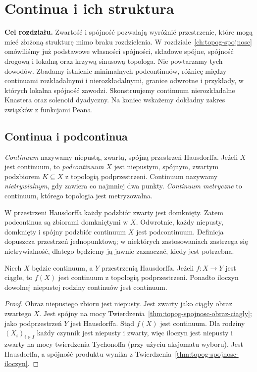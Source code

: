 \chapter{Continua i ich struktura}
\label{ch:topog25-continua}

\noindent\textbf{Cel rozdziału.}
Zwartość i spójność pozwalają wyróżnić przestrzenie, które
mogą mieć złożoną strukturę mimo braku rozdzielenia.
W rozdziale~\ref{ch:topog-spojnosc} omówiliśmy już
podstawowe własności spójności, składowe spójne,
spójność drogową i lokalną oraz krzywą sinusową topologa.
Nie powtarzamy tych dowodów.
Zbadamy istnienie minimalnych podcontinuów,
różnicę między continuami rozkładalnymi i nierozkładalnymi,
granice odwrotne i przykłady, w których lokalna spójność
zawodzi.
Skonstruujemy continuum nierozkładalne Knastera
oraz solenoid dyadyczny.
Na koniec wskażemy dokładny zakres związków
z funkcjami Peana.

\section{Continua i podcontinua}
\label{sec:topog25-basic}

\begin{definicja}
\label{def:topog25-continuum}
\emph{Continuum} nazywamy niepustą, zwartą,
spójną przestrzeń Hausdorffa.
Jeżeli \(X\) jest continuum,
to \emph{podcontinuum} \(X\)
jest niepustym, spójnym, zwartym podzbiorem \(K\subseteq X\)
z topologią podprzestrzeni.
Continuum nazywamy \emph{nietrywialnym},
gdy zawiera co najmniej dwa punkty.
\emph{Continuum metryczne} to continuum,
którego topologia jest metryzowalna.
\end{definicja}

\begin{uwaga}
\label{rem:topog25-closed}
W przestrzeni Hausdorffa każdy podzbiór zwarty
jest domknięty. Zatem podcontinua są zbiorami
domkniętymi w \(X\). Odwrotnie, każdy
niepusty, domknięty i spójny podzbiór
continuum \(X\) jest podcontinuum.
Definicja dopuszcza przestrzeń jednopunktową;
w niektórych zastosowaniach zastrzega się
nietrywialność, dlatego będziemy
ją jawnie zaznaczać, kiedy jest potrzebna.
\end{uwaga}

\begin{stwierdzenie}
\label{prop:topog25-images-products}
Niech \(X\) będzie continuum, a \(Y\)
przestrzenią Hausdorffa.
Jeżeli \(f\colon X\to Y\) jest ciągłe,
to \(f(X)\) jest continuum z topologią podprzestrzeni.
Ponadto iloczyn dowolnej niepustej rodziny
continuów jest continuum.
\end{stwierdzenie}
\begin{proof}
Obraz niepustego zbioru jest niepusty.
Jest zwarty jako ciągły obraz zwartego \(X\).
Jest spójny na mocy
Twierdzenia~\ref{thm:topog-spojnosc-obraz-ciagly};
jako podprzestrzeń \(Y\) jest Hausdorffa.
Stąd \(f(X)\) jest continuum.
Dla rodziny \((X_i)_{i\in I}\)
każdy czynnik jest niepusty i zwarty,
więc iloczyn jest niepusty i zwarty
na mocy twierdzenia Tychonoffa
(przy użyciu aksjomatu wyboru).
Jest Hausdorffa, a spójność produktu
wynika z
Twierdzenia~\ref{thm:topog-spojnosc-iloczyn}.
\end{proof}

